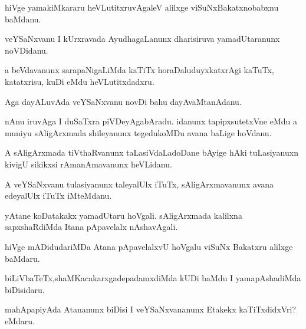 \documentclass{article}
\begin{document}
\begin{mn}%
hiVge yamakiMkararu heVLutitxruvAgaleV alilxge viSuNxBakatxnobabxnu baMdanu.
\end{mn}

\begin{mn}%
veYSaNxvanu I kUrxravada AyudhagaLanunx dharisiruva yamadUtaranunx noVDidanu.
\end{mn}

\begin{mn}%
a beVdavanunx sarapaNigaLiMda kaTiTx horaDaluduyxkatxrAgi kaTuTx, katatxrisu, kuDi eMdu 
heVLutitxdadxru.
\end{mn}

\begin{mn}%
Aga dayALuvAda veYSaNxvanu novDi bahu dayAvaMtanAdanu.
\end{mn}

\begin{mn}%
nAnu iruvAga I duSaTxra piVDeyAgabAradu. idanunx tapipxsutetxVne eMdu a muniyu 
sAligArxmada shileyanunx tegedukoMDu avana baLige hoVdanu.
\end{mn}

\begin{mn}%
A sAligArxmada tiVthaRvanunx taLasiVdaLadoDane bAyige hAki tuLasiyanuxn kivigU sikikxsi 
rAmanAmavanunx heVLidanu.
\end{mn}

\begin{mn}%
A veYSaNxvanu tulasiyanunx taleyalUlx iTuTx, sAligArxmavanunx avana edeyalUlx iTuTx 
iMteMdanu.
\end{mn}

\begin{mn}%
yAtane koDatakakx yamadUtaru hoVgali. sAligArxmada kalilxna sapxshaRdiMda Itana pApavelalx 
nAshavAgali.
\end{mn}

\begin{mn}%
hiVge mADidudariMDa Atana pApavelalxvU hoVgalu viSuNx Bakatxru alilxge baMdaru.
\end{mn}

\begin{mn}%
biLiVbaTeTx,shaMKacakarxgadepadamxdiMda kUDi baMdu I yamapAshadiMda biDisidaru.
\end{mn}

\begin{mn}%
mahApapiyAda Atananunx biDisi I veYSaNxvananunx Etakekx kaTiTxdidxVri? eMdaru.
\end{mn}
\end{document}
